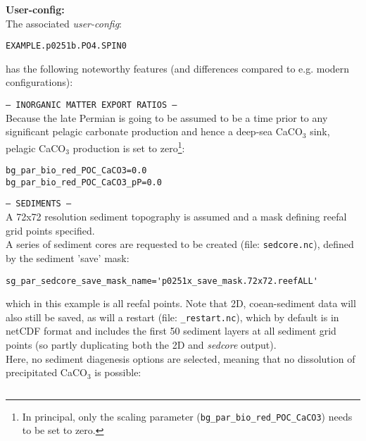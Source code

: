 \documentclass[10pt,twoside]{article}
\begin{document}
\noindent \textbf{User-config:} 
\\ The associated \textit{user-config}:
\vspace{-10pt}\begin{verbatim}EXAMPLE.p0251b.PO4.SPIN0\end{verbatim}\vspace{-10pt}
has the following noteworthy features (and differences compared to e.g. modern configurations):
\begin{compactitem}
                \item \texttt{--- INORGANIC MATTER EXPORT RATIOS ---}
                \\ Because the late Permian is going to be assumed to be a time prior to any significant pelagic carbonate production and hence a deep-sea CaCO$_{3}$ sink, pelagic CaCO$_{3}$ production is set to zero\footnote{In principal, only the scaling parameter (\texttt{bg\_par\_bio\_red\_POC\_CaCO3}) needs to be set to zero.}:
\vspace{-5pt}\begin{verbatim}
bg_par_bio_red_POC_CaCO3=0.0
bg_par_bio_red_POC_CaCO3_pP=0.0
                \end{verbatim}\vspace{-5pt}
                \item \texttt{--- SEDIMENTS ---}
                \\ A 72x72 resolution sediment topography is assumed and a mask defining reefal grid points specified.
                \\ A series of sediment cores are requested to be created (file: \texttt{sedcore.nc}), defined by the sediment 'save' mask:
\vspace{-5pt}\begin{verbatim}
sg_par_sedcore_save_mask_name='p0251x_save_mask.72x72.reefALL'
                \end{verbatim}\vspace{-5pt}
                which in this example is all reefal points. Note that 2D, coean-sediment data will also still be saved, as will a restart (file: \texttt{\_restart.nc}), which by default is in netCDF format and includes the first 50 sediment layers at all sediment grid points (so partly duplicating both the 2D and \textit{sedcore} output).
                \\ Here, no sediment diagenesis options are selected, meaning that no dissolution of precipitated CaCO\(_{3}\) is possible:
\vspace{-5pt}\begin{verbatim}

\end{verbatim}
\end{compactitem}
\end{document}
